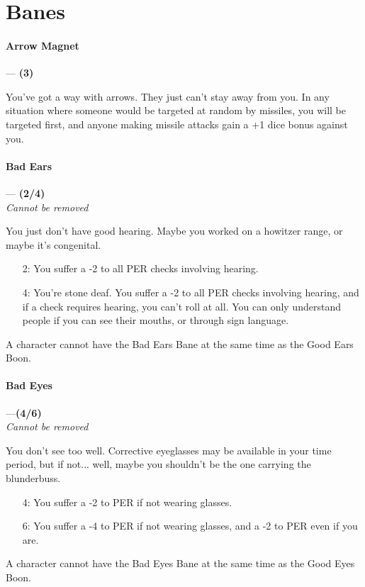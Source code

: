 \documentclass[oneside,11pt,english]{book}
\begin{document}
\section{Banes}
\paragraph{\label{bane:Arrow Magnet}Arrow Magnet}---\quad\textbf{ (3)}\par
You've got a way with arrows. They just can't stay away from you. In any situation where someone would 
be targeted at random by missiles, you will be targeted first, and anyone making missile attacks gain a +1 dice bonus against you. 
\paragraph{\label{bane:Bad Ears}Bad Ears}---\quad\textbf{ (2/4)}\\
\textit{Cannot be removed}\par
You just don't have good hearing. Maybe you worked on a howitzer range, or maybe it's congenital. 
\begin{itemize}
	\item [2:] You suffer a -2 to all PER checks involving hearing. 
	\item [4:] You're stone deaf. You suffer a -2 to all PER checks involving hearing, and if a check requires hearing, 
you can't roll at all. You can only understand people if you can see their mouths, or through sign 
language. 
\end{itemize}
A character cannot have the Bad Ears Bane at the same time as the Good Ears Boon. 
\paragraph{\label{bane:Bad Eyes}Bad Eyes}---\quad\textbf{(4/6)}\\
\textit{Cannot be removed}\par
You don't see too well. Corrective eyeglasses may be available in your time period, but if not... well, 
maybe you shouldn't be the one carrying the blunderbuss. 
\begin{itemize}
\item [4:] You suffer a -2 to PER if not wearing glasses. 
\item [6:] You suffer a -4 to PER if not wearing glasses, and a -2 to PER even if you are. 
\end{itemize}
A character cannot have the Bad Eyes Bane at the same time as the Good Eyes Boon. 
\end{document}
